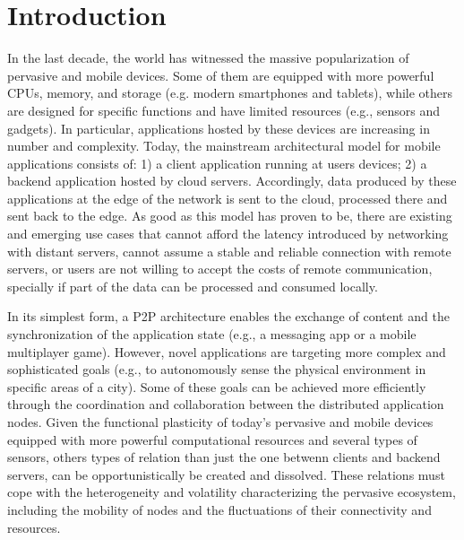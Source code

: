 \section{Introduction}
\label{sec:intro}


In the last decade, the world has witnessed the massive popularization of pervasive and mobile devices. Some of them are equipped with more powerful CPUs, memory, and storage (e.g. modern smartphones and tablets), while others are designed for specific functions and have limited resources (e.g., sensors and gadgets). In particular, applications hosted by these devices are increasing in number and complexity. Today, the mainstream architectural model for mobile applications consists of: 1) a client application running at users devices; 2) a backend application hosted by cloud servers. Accordingly, data produced by these applications at the edge of the network is sent to the cloud, processed there and sent back to the edge. As good as this model has proven to be, there are existing and emerging use cases that cannot afford the latency introduced by networking with distant servers, cannot assume a stable and reliable connection with remote servers, or users are not willing to accept the costs of remote communication, specially if part of the data can be processed and consumed locally.

In its simplest form, a P2P architecture enables the exchange of content and the synchronization of the application state (e.g., a messaging app or a mobile multiplayer game). However, novel applications are targeting more complex and sophisticated goals (e.g., to autonomously sense the physical environment in specific areas of a city). Some of these goals can be achieved more efficiently through the coordination and collaboration between the distributed application nodes. 
Given the functional plasticity of today's pervasive and mobile devices equipped with more powerful computational resources and several types of sensors, 
others types of relation than just the one betwenn clients and backend servers, can be opportunistically be created and dissolved. These relations must cope with the heterogeneity and volatility characterizing the pervasive ecosystem, including the mobility of nodes and the fluctuations of their connectivity and resources. 

